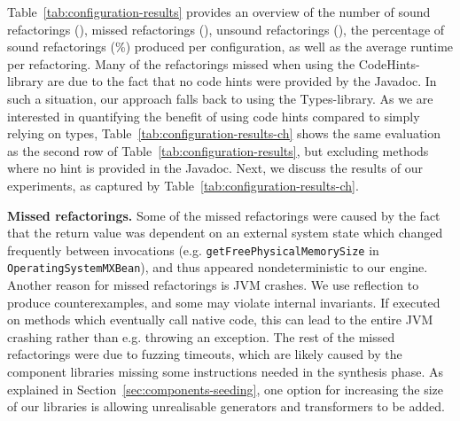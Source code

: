 \documentclass[10pt,conference]{IEEEtran}
\begin{document}
Table~\ref{tab:configuration-results} provides an overview of the number of
sound refactorings (\checkmark), missed refactorings (\xmark), unsound
refactorings (\lightning), the percentage of sound refactorings (\%)
produced per configuration, as well as the average runtime per refactoring. 
Many of the refactorings missed when
using the CodeHints-library are
due to the fact that no code hints were provided by the Javadoc.
%
In such a situation, our approach falls back to using the
Types-library. As we are interested in quantifying the benefit of
using code hints compared to simply relying on types,
Table~\ref{tab:configuration-results-ch} shows the same evaluation as the second row 
of Table~\ref{tab:configuration-results}, but excluding methods where
no hint is provided in the Javadoc. Next, we discuss the results of our
experiments, as captured by Table~\ref{tab:configuration-results-ch}.

{\bf Missed refactorings.}
Some of the missed refactorings were caused by the fact that the return
value was dependent on an external system state which changed frequently between
invocations (e.g. \texttt{getFreePhysicalMemorySize} in \texttt{OperatingSystemMXBean}),
and thus appeared nondeterministic to our engine.
%
Another reason for missed refactorings is JVM crashes. We use reflection to produce counterexamples,
and some may violate internal invariants.
If executed on methods which eventually call native code, this can lead to the entire JVM
crashing rather than e.g. throwing an exception. %
%
The rest of the missed refactorings were due to fuzzing timeouts, which are likely 
caused by the component libraries missing some
instructions needed in the synthesis phase.
As explained in Section~\ref{sec:components-seeding}, one option 
for increasing the size of our libraries 
is allowing unrealisable generators and transformers to
be added.
\end{document}
